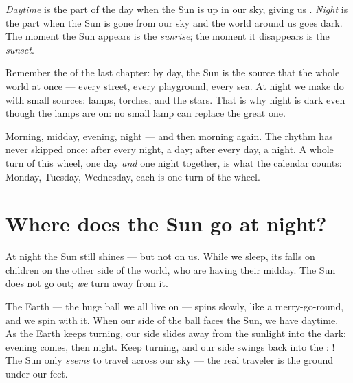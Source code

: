 \begin{definition}\label{def:g1:day-and-night:daynight}
\emph{Daytime} is the part of the day when the Sun is
up in our sky, giving us . \emph{Night} is the part
when the Sun is gone from our sky and the world around us goes dark.
The moment the Sun appears is the \emph{sunrise}; the
moment it disappears is the \emph{sunset}.
\end{definition}

\begin{remark}\label{rem:g1:day-and-night:lamp}
Remember the  of the last chapter: by day, the Sun is
the source that  the whole world at once --- every street,
every playground, every sea. At night we make do with small sources:
lamps, torches, and the stars. That is why night is dark even though
the lamps are on: no small lamp can replace the great one.
\end{remark}

\begin{example}\label{ex:g1:day-and-night:rhythm}
Morning, midday, evening, night --- and then morning again. The
rhythm has never skipped once: after every night, a day; after
every day, a night. A whole turn of this wheel, one day \emph{and}
one night together, is what the calendar counts: Monday, Tuesday,
Wednesday, each is one turn of the wheel.
\end{example}

\section{Where does the Sun go at night?}

At night the Sun still shines --- but not on us. While we sleep, its
 falls on children on the other side of the world, who are
having their midday. The Sun does not go out; \emph{we} turn away
from it.

\begin{example}\label{ex:g1:day-and-night:spinning}
The Earth --- the huge ball we all live on --- spins slowly, like a
merry-go-round, and we spin with it. When our side of the ball faces
the Sun, we have daytime. As the Earth keeps turning, our side slides
away from the sunlight into the dark: evening comes, then night. Keep
turning, and our side swings back into the : ! The Sun
only \emph{seems} to travel across our sky --- the real traveler is
the ground under our feet.
\end{example}

